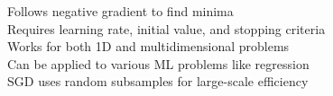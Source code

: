 \documentclass[preview]{standalone}
\begin{document}
Follows negative gradient to find minima\\Requires learning rate, initial value, and stopping criteria\\Works for both 1D and multidimensional problems\\Can be applied to various ML problems like regression\\SGD uses random subsamples for large-scale efficiency\\
\end{document}
